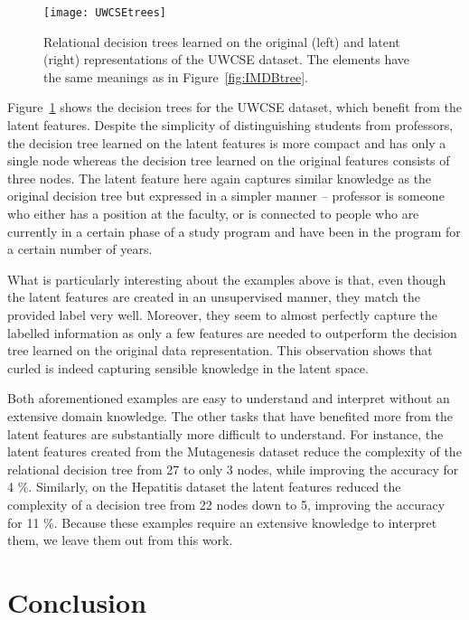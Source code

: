 \begin{figure}[t]
	\centering
	\medskip
	\texttt{[image: UWCSEtrees]}
    \caption{Relational decision trees learned on the original (left) and latent (right) representations of the UWCSE dataset. The elements have the same meanings as in Figure~\ref{fig:IMDBtree}. }
    \label{fig:UWCSEtree}
\end{figure}



Figure~\ref{fig:UWCSEtree} shows the decision trees for the UWCSE dataset, which benefit from the latent features.
Despite the simplicity of distinguishing students from professors, the decision tree learned on the latent features is more compact and has only a single node whereas the decision tree learned on the original features consists of three nodes.
The latent feature here again captures similar knowledge as the original decision tree but expressed in a simpler manner -- professor is someone who either has a position at the faculty, or is connected to people who are currently in a certain phase of a study program and have been in the program for a certain number of years.




What is particularly interesting about the examples above is that, even though the latent features are created in an unsupervised manner, they match the provided label very well.
Moreover, they seem to almost perfectly capture the labelled information as only a few features are needed to outperform the decision tree learned on the original data representation.
This observation shows that \gls{curled} is indeed capturing sensible knowledge in the latent space.



Both aforementioned examples are easy to understand and interpret without an extensive domain knowledge.
The other tasks that have benefited more from the latent features are substantially more difficult to understand.
For instance, the latent features created from the Mutagenesis dataset reduce the complexity of the relational decision tree from 27 to only 3 nodes, while improving the accuracy for 4 \%.
Similarly, on the Hepatitis dataset the latent features reduced the complexity of a decision tree from 22 nodes down to 5, improving the accuracy for 11 \%.
Because these examples require an extensive knowledge to interpret them, we leave them out from this work.



\section{Conclusion}
\label{sec:Conc}


